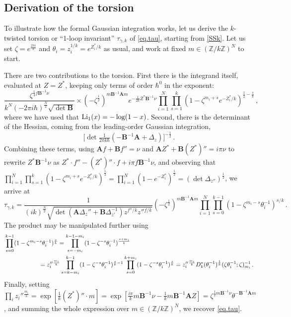 \documentclass[12pt]{amsart}
\theoremstyle{definition}
\def\BZ{\mathbb Z}
\def\be{  \begin{equation} }
\def\ee{  \end{equation} }
\newcommand{\Li}{{\rm Li}}
\newcommand{\mb}{\mathbf}
\begin{document}
\subsection{Derivation of the torsion}
\label{sub.derivation.torsion}

To illustrate how the formal Gaussian integration works, let us derive the 
$k$-twisted torsion or ``1-loop invariant'' $\tau_{\gamma,k}$ of 
\eqref{eq.tau}, starting from \eqref{SSk}. Let us set 
$\zeta=e^{\frac{2\pi i}{k}}$ and $\theta_i = z_i^{1/k} = e^{Z_i^*/k}$ as usual, 
and work at fixed $m\in (\BZ/k \BZ)^N$ to start.

There are two contributions to the torsion. First there is the integrand 
itself, evaluated at $Z=Z^*$, keeping only terms of order $\hbar^0$ in the 
exponent:
%
\be  
\frac{\zeta^{\frac14 f\mb B^{-1}\nu}}{k^N (-2\pi i \hbar)^{\frac N2}
\sqrt{\det \mb B}} \times (-\zeta^{\frac12})^{m\mb B^{-1}\mb Am}
e^{-\frac1{2k}Z^*\mb B^{-1}\nu} \prod_{i=1}^N \prod_{s=1}^{k} 
(1-\zeta^{m_i+s}e^{-Z_i^*/k})^{\frac12-\frac sk} \,, 
\ee
%
where we have used that $\Li_1(x) = -\log(1-x)$. Second, there is the 
determinant of the Hessian, coming from the leading-order Gaussian integration,
%
\be \big[\det  \tfrac{1}{2\pi k\hbar}
(-\mb B^{-1}\mb A + \Delta_z)\big]^{-\frac12}\,. 
\ee
%
Combining these terms, using $\mb Af+\mb Bf''=\nu$ and 
$\mb AZ^*+\mb B(Z^*)''=i\pi \nu$ to rewrite $Z^*\mb B^{-1}\nu$ as 
$Z^*\cdot f'' - (Z^*)''\cdot f+i\pi f\mb B^{-1}\nu$, and observing that 
$\prod_{i=1}^N\prod_{s=1}^k(1-\zeta^{m_i+s}e^{-Z_i^*/k})^{\frac12} 
= \prod_{i=1}^N (1-e^{-Z_i^*})^{\frac12} = (\det \Delta_{z''})^{\frac12}$,
we arrive at
%
\be 
\tau_{\gamma,k} = \frac{1}{(ik)^{\frac N2}
\sqrt{\det(\mb A\Delta_z''+\mb B\Delta_{z'}^{-1})z^{f''/k}z''{}^{f/k}}} 
(-\zeta^{\frac12})^{m\mb B^{-1}\mb Am}
\prod_{i=1}^N \prod_{s=0}^{k-1} (1-\zeta^{m_i-s}\theta_i^{-1})^{s/k}\,.
\ee
%
The product may be manipulated further using
%
\begin{align*} & \prod_{s=0}^{k-1}(1-\zeta^{m_i-s}\theta_i^{-1})^{\frac sk} 
= \prod_{s=-m_i}^{k-1-m_i}(1-\zeta^{-s}\theta_i^{-1})^{\frac {s+m_i}{k}}  \\
&\hspace{.8in}
= z_i''{}^{\frac {m_i}{k}} \prod_{s=k-m_i}^{k-1}
(1-\zeta^{-s}\theta_i^{-1})^{\frac sk-1}\prod_{s=0}^{k+m_i}
(1-\zeta^{-s}\theta_i^{-1})^{\frac sk} = z_i''{}^{\frac {m_i}{k}} 
D_k^*(\theta_i^{-1})^{\frac 1k} (\zeta\theta_i^{-1};\zeta)_{m_i}^{-1}\,.
\end{align*}
%
Finally, setting 
$\prod_i z_i''{}^{\frac {m_i}k} = \exp[\frac1k (Z^*)''\cdot m] 
= \exp[\frac {i\pi}k m\mb B^{-1}\nu-\frac 1k m\mb B^{-1}\mb AZ]
=\zeta^{\frac12 m\mb B^{-1}\nu}\theta^{-\mb B^{-1}\mb Am}$,
and summing the whole expression over $m\in (\BZ/k\BZ)^N$, we recover 
\eqref{eq.tau}.
\end{document}
